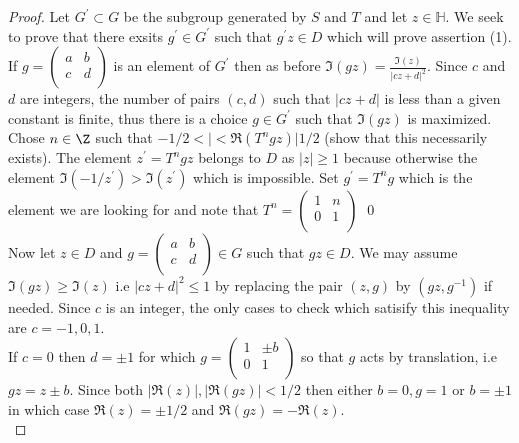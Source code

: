 \documentclass[12pt]{article}
\theoremstyle{definition}
\begin{document}
    \begin{proof}
        Let \(G^{\prime} \subset G  \) be the subgroup generated by \(S\) and \(T\) and let \(z\in \mathbb{H} \). We seek to prove that there exsits \(g^{\prime} \in G^{\prime} \) such that \( g^{\prime} z\in D\) which will prove assertion (1). If \(g = \begin{pmatrix}
            a &  b \\
            c &  d \\
        \end{pmatrix}\) is an element of \(G^{\prime} \) then as before \(\Im(gz)=\frac{\Im(z)}{\vert cz+d \vert^{2} }\). Since \(c\) and \(d\) are integers, the number of pairs \((c,d)\) such that \(\vert cz+d \vert \) is less than a given constant is finite, thus there is a choice \( g\in G^{\prime} \) such that \(\Im(gz)\) is maximized.\\
        Chose \(n\in \Z\) such that \(-1/2 < \vert < \Re (T^{n}gz)  \vert 1/2\) (show that this necessarily exists). The element \(z^{\prime} =T^{n}gz \) belongs to \(D\) as \(\vert z \vert \geq 1\) because otherwise the element \(\Im(-1/z^{\prime} )> \Im(z^{\prime} )\) which is impossible. Set \( g^{\prime} =T^n g\) which is the element we are looking for and note that
        \(T^n = \begin{pmatrix}
            1 &  n \\
            0 &  1 \\
        \end{pmatrix} \)  \qed\\
        Now let \(z\in D\) and \( g = \begin{pmatrix}
            a &  b \\
            c &  d \\
        \end{pmatrix}\in G\) such that \(gz\in D\). We may assume \(\Im(gz)\geq \Im(z)\) i.e \(\vert cz+d \vert^2 \leq 1\) by replacing the pair \((z,g)\) by \((gz,g^{-1} )\) if needed. Since \(c\) is an integer, the only cases to check which satisify this inequality are \(c=-1,0,1\).\\
        If \(c=0\) then \(d=\pm 1\) for which \(g = \begin{pmatrix}
            1 &  \pm b \\
            0 & 1  \\
        \end{pmatrix}\) so that \(g\) acts by translation, i.e \(gz = z \pm b\). Since both \(\vert \Re (z) \vert, \vert \Re (gz) \vert <1/2\) then either \( b=0, g = 1\) or \( b= \pm 1\) in which case  \(\Re (z) = \pm 1/2\) and \(\Re (gz) = -\Re (z)\).\\

\end{proof}
\end{document}
